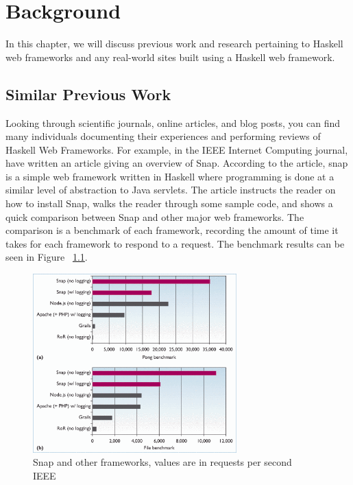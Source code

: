 \chapter{Background}
\label{chap:Background}

In this chapter, we will discuss previous work and research pertaining
to Haskell web frameworks and any real-world sites built using a Haskell
web framework.

\section{Similar Previous Work}

Looking through scientific journals, online articles, and blog posts,
you can find many individuals documenting their experiences and performing
reviews of Haskell Web Frameworks. For example, in the IEEE Internet Computing
journal, \citeauthor{snapFramework} have written an article giving an overview
of Snap. According to the article, snap is a simple web framework written
in Haskell where programming is done at a similar level of abstraction
to Java servlets. The article instructs the reader on how to install Snap, 
walks the reader through some sample code, and shows a quick comparison
between Snap and other major web frameworks. The comparison is a benchmark
of each framework, recording the amount of time it takes for each framework
to respond to a request. The benchmark results can be seen in Figure 
~\ref{fig:snapBenchmark}. \parencite{snapFramework}

\begin{figure}[H]
    \centering
    \includegraphics[width=0.7\textwidth]{final_report/pics/snapBenchmark.png}
    \caption{Snap and other frameworks, values are in requests per second \\ \textcopyright{} \citeyear{snapFramework} IEEE}
    \label{fig:snapBenchmark}
\end{figure}


